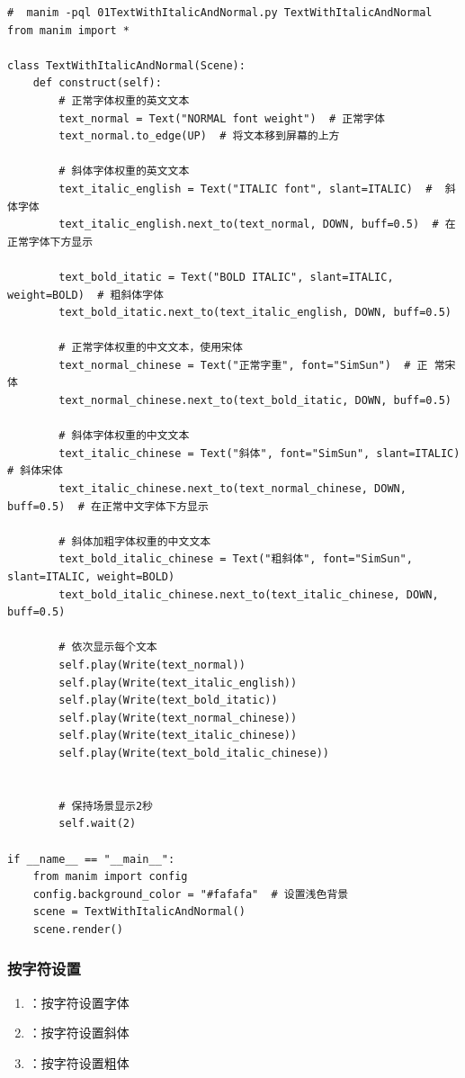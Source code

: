 \begin{lstlisting}[style=pythonstyle]
#  manim -pql 01TextWithItalicAndNormal.py TextWithItalicAndNormal       
from manim import *

class TextWithItalicAndNormal(Scene):
    def construct(self):
        # 正常字体权重的英文文本
        text_normal = Text("NORMAL font weight")  # 正常字体
        text_normal.to_edge(UP)  # 将文本移到屏幕的上方

        # 斜体字体权重的英文文本
        text_italic_english = Text("ITALIC font", slant=ITALIC)  #  斜体字体
        text_italic_english.next_to(text_normal, DOWN, buff=0.5)  # 在正常字体下方显示

        text_bold_itatic = Text("BOLD ITALIC", slant=ITALIC, weight=BOLD)  # 粗斜体字体
        text_bold_itatic.next_to(text_italic_english, DOWN, buff=0.5)

        # 正常字体权重的中文文本，使用宋体
        text_normal_chinese = Text("正常字重", font="SimSun")  # 正 常宋体
        text_normal_chinese.next_to(text_bold_itatic, DOWN, buff=0.5)

        # 斜体字体权重的中文文本
        text_italic_chinese = Text("斜体", font="SimSun", slant=ITALIC)  # 斜体宋体
        text_italic_chinese.next_to(text_normal_chinese, DOWN, buff=0.5)  # 在正常中文字体下方显示

        # 斜体加粗字体权重的中文文本
        text_bold_italic_chinese = Text("粗斜体", font="SimSun", slant=ITALIC, weight=BOLD)
        text_bold_italic_chinese.next_to(text_italic_chinese, DOWN, buff=0.5)

        # 依次显示每个文本
        self.play(Write(text_normal))
        self.play(Write(text_italic_english))
        self.play(Write(text_bold_itatic))
        self.play(Write(text_normal_chinese))
        self.play(Write(text_italic_chinese))
        self.play(Write(text_bold_italic_chinese))


        # 保持场景显示2秒
        self.wait(2)

if __name__ == "__main__":
    from manim import config
    config.background_color = "#fafafa"  # 设置浅色背景
    scene = TextWithItalicAndNormal()
    scene.render()
\end{lstlisting}       



\subsubsection{按字符设置}
\label{subsubsec:manim_text_formula_style_font_char}
\begin{enumerate}[label=\arabic*)]
    \item {}：按字符设置字体
    \item {}：按字符设置斜体
    \item {}：按字符设置粗体
\end{enumerate}

